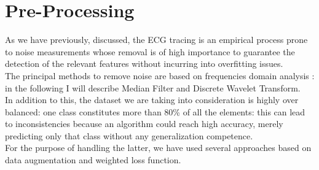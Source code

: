 \documentclass[LaM,binding=0.6cm]{sapthesis}
\begin{document}
\chapter{Pre-Processing}
As we have previously, discussed, the ECG tracing is an empirical process prone to noise measurements whose removal is of high importance to guarantee the detection of the relevant features without incurring into overfitting issues.\\The principal methods to remove noise are based on frequencies domain analysis : in the following I will describe Median Filter and Discrete Wavelet Transform.\\In addition to this, the dataset we are taking into consideration is highly over balanced: one class constitutes more than 80\% of all the elements: this can lead to inconsistencies because an algorithm could reach high accuracy, merely predicting only that class without any generalization competence.\\For the purpose of handling the latter, we have used several approaches based on data augmentation and weighted loss function. 
\end{document}
